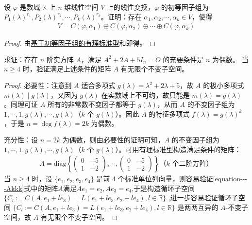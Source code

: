 \documentclass[../../main.tex]{subfiles}
\begin{document}
\begin{theorem}\label{theorem:基于初等因子组的循环子空间之和分解}
设 $\varphi$ 是数域 $\mathbb{K}$ 上 $n$ 维线性空间 $V$ 上的线性变换，$\varphi$ 的初等因子组为 $P_1(\lambda)^{r_1},P_2(\lambda)^{r_2},\cdots,P_k(\lambda)^{r_k}$。证明：存在 $\alpha_1,\alpha_2,\cdots,\alpha_k\in V$，使得
\begin{align*}
V = C(\varphi,\alpha_1)\oplus C(\varphi,\alpha_2)\oplus\cdots\oplus C(\varphi,\alpha_k)
\end{align*}
\end{theorem}
\begin{proof}
由\hyperref[theorem:基于初等因子组的有理标准型]{基于初等因子组的有理标准型}和即得。
\end{proof}

\begin{example}
求证：存在 $n$ 阶实方阵 $A$，满足 $A^2 + 2A + 5I_n = O$ 的充要条件是 $n$ 为偶数。
当 $n\geq 4$ 时，验证满足上述条件的矩阵 $A$ 有无限个不变子空间。
\end{example}
\begin{proof}
{\heiti 必要性：}注意到 $A$ 适合多项式 $g(\lambda)=\lambda^2 + 2\lambda + 5$，故 $A$ 的极小多项式 $m(\lambda)\mid g(\lambda)$，又因为 $g(\lambda)$ 在实数域上不可约，故只能是 $m(\lambda)=g(\lambda)$。同理可证 $A$ 所有的非常数不变因子都等于 $g(\lambda)$，从而 $A$ 的不变因子组为 $1,\cdots,1,g(\lambda),\cdots,g(\lambda)$（$k$ 个 $g(\lambda)$）。因此 $A$ 的特征多项式 $f(\lambda)=g(\lambda)^k$，于是 $n = \deg f(\lambda)=2k$ 为偶数。

{\heiti 充分性：}设 $n = 2k$ 为偶数，则由必要性的证明可知，$A$ 的不变因子组为 $1,\cdots,1,g(\lambda),\cdots,g(\lambda)$（$k$ 个 $g(\lambda)$）。可用有理标准型构造满足条件的矩阵：
\begin{align}\label{equation----Akkk}
A=\mathrm{diag}\left\{\begin{pmatrix}
0 & -5 \\
1 & -2
\end{pmatrix},\cdots,\begin{pmatrix}
0 & -5 \\
1 & -2
\end{pmatrix}\right\} \text{（$k$ 个二阶方阵）}
\end{align}
当 $n\geq 4$ 时，设 $\{e_1,e_2,e_3,e_4\}$ 是前 4 个标准单位列向量，则容易验证\eqref{equation----Akkk}式中的矩阵$A$满足$Ae_1=e_2,Ae_3=e_4$,于是构造循环子空间 $\{C_l := C(A,e_1 + le_3)=L(e_1 + le_3,e_2 + le_4),l\in\mathbb{R}\}$ ,进一步容易验证循环子空间 $\{C_l := C(A,e_1 + le_3)=L(e_1 + le_3,e_2 + le_4),l\in\mathbb{R}\}$ 是两两互异的 $A$-不变子空间，故 $A$ 有无限个不变子空间。
\end{proof}
\end{document}
